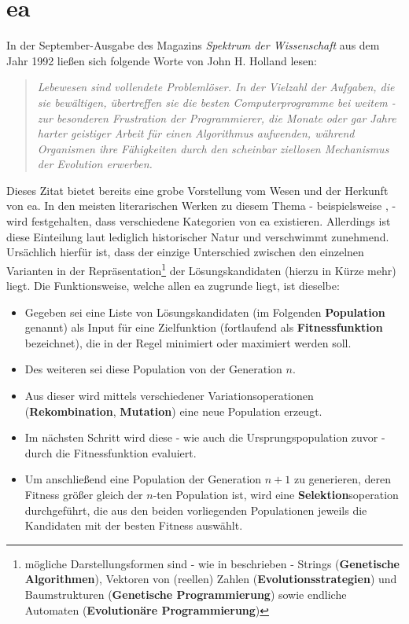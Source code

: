 	\section{\gls{ea}}
	\label{sec:evol}
		
		In der September-Ausgabe des Magazins \textit{Spektrum der Wissenschaft} \cite{j-h-holland} aus dem Jahr 1992 ließen sich folgende Worte von John H. Holland lesen: \\
		
		\begin{quote}
			\textit{Lebewesen sind vollendete Problemlöser. In der Vielzahl der Aufgaben, die sie bewältigen, übertreffen sie die besten Computerprogramme bei weitem - zur besonderen Frustration der Programmierer, die Monate oder gar Jahre harter geistiger Arbeit für einen Algorithmus aufwenden, während Organismen ihre Fähigkeiten durch den scheinbar ziellosen Mechanismus der Evolution erwerben.}
		\end{quote}
		
		Dieses Zitat bietet bereits eine grobe Vorstellung vom Wesen und der 
		Herkunft von \gls{ea}. In den meisten literarischen Werken zu diesem 
		Thema - beispielsweise \cite{ger-kla-kru-intro}, \cite{eib-smi-ea} - 
		wird festgehalten, dass verschiedene Kategorien von \gls{ea} 
		existieren. Allerdings ist diese Einteilung laut \cite{eib-smi-ea} 
		lediglich historischer Natur und verschwimmt zunehmend. Ursächlich 
		hierfür ist, dass der einzige Unterschied zwischen den einzelnen 
		Varianten in der Repräsentation\footnote{mögliche Darstellungsformen 
		sind - wie in \cite{eib-smi-ea} beschrieben - Strings 
		(\textbf{Genetische Algorithmen}), Vektoren von (reellen) 
		Zahlen (\textbf{Evolutionsstrategien}) und Baumstrukturen 
		(\textbf{Genetische Programmierung}) sowie endliche Automaten 
		(\textbf{Evolutionäre Programmierung})} der Lösungskandidaten (hierzu 
		in Kürze mehr) liegt. Die Funktionsweise, welche allen \gls{ea} 
		zugrunde liegt, ist dieselbe: \\
		\begin{itemize}
			\item Gegeben sei eine Liste von Lösungskandidaten (im Folgenden \textbf{Population} genannt) als Input für eine Zielfunktion (fortlaufend als \textbf{Fitnessfunktion} bezeichnet), die in der Regel minimiert oder maximiert werden soll.
			\item Des weiteren sei diese Population von der Generation $n$.
			\item Aus dieser wird mittels verschiedener Variationsoperationen (\textbf{Rekombination}, \textbf{Mutation}) eine neue Population  erzeugt.
			\item Im nächsten Schritt wird diese - wie auch die Ursprungspopulation zuvor - durch die Fitnessfunktion evaluiert.
			\item Um anschließend eine Population der Generation $n+1$ zu generieren, deren Fitness größer gleich der $n$-ten Population ist, wird eine \textbf{Selektion}soperation durchgeführt, die aus den beiden vorliegenden Populationen jeweils die Kandidaten mit der besten Fitness auswählt.
		\end{itemize}
		
